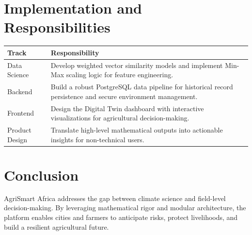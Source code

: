 \documentclass[11pt]{article}
\begin{document}
\section{Implementation and Responsibilities}
\begin{table}[h]
\centering
\begin{tabular}{lp{10cm}}
\toprule
\textbf{Track} & \textbf{Responsibility} \\ \midrule
Data Science & Develop weighted vector similarity models and implement Min-Max scaling logic for feature engineering. \\
Backend & Build a robust PostgreSQL data pipeline for historical record persistence and secure environment management. \\
Frontend & Design the Digital Twin dashboard with interactive visualizations for agricultural decision-making. \\
Product Design & Translate high-level mathematical outputs into actionable insights for non-technical users. \\ \bottomrule
\end{tabular}
\end{table}

\section{Conclusion}
AgriSmart Africa addresses the gap between climate science and field-level decision-making. By leveraging mathematical rigor and modular architecture, the platform enables cities and farmers to anticipate risks, protect livelihoods, and build a resilient agricultural future.
\end{document}
